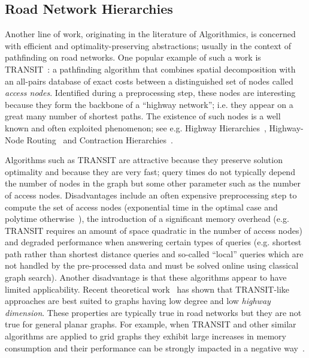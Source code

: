 \subsection{Road Network Hierarchies}
Another line of work, originating in the literature of Algorithmics, is
concerned with efficient and optimality-preserving abstractions; usually in
the context of pathfinding on road networks.  One popular example of such a
work is TRANSIT~\citep{bast06,bast07}: a pathfinding algorithm that combines
spatial decomposition with an all-pairs database of exact costs between a
distinguished set of nodes called \emph{access nodes}. Identified during a
preprocessing step, these nodes are interesting because they form the backbone
of a ``highway network''; i.e. they appear on a great many number of shortest paths.
The existence of such nodes is a well known and often exploited phenomenon;
see e.g. Highway Hierarchies~\citep{sanders05,sanders06}, Highway-Node
Routing~\citep{schultes07} and Contraction Hierarchies~\citep{geisberger08}.

Algorithms such as TRANSIT are attractive because they preserve solution 
optimality and because they are very
fast; query times do not typically depend the number of nodes in the graph but some 
other parameter such as the number of access nodes.
Disadvantages include an often expensive preprocessing
step to compute the set of access nodes (exponential time in the optimal case 
and polytime otherwise~\cite{abrahamDFGW13}), the introduction of a 
significant memory overhead (e.g. TRANSIT requires an amount of space quadratic 
in the number of access nodes) and degraded performance when answering certain
types of queries (e.g. shortest path rather than shortest distance queries and
so-called ``local'' queries which are not handled by the pre-processed data and 
must be solved online using classical graph search).
Another disadvantage is that these algorithms appear to have limited applicability. 
Recent theoretical
work~\citep{abraham10,abrahamDFGW13} has shown that TRANSIT-like approaches are 
best suited to graphs having low degree and low \emph{highway dimension}.
These properties are typically true in road networks but they are not true for 
general planar graphs.  For example, when TRANSIT and other similar algorithms 
are applied to grid graphs they exhibit large increases in memory consumption 
and their performance can be strongly impacted in a negative way~\citep{antsfeld12}.
